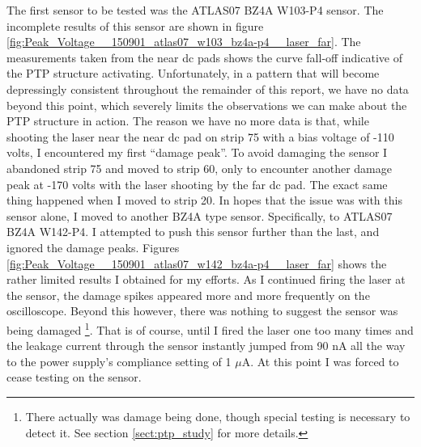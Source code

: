 \documentclass{report}
\begin{document}
            The first sensor to be tested was the ATLAS07 BZ4A W103-P4 sensor. The incomplete results of this sensor are shown in figure \ref{fig:Peak_Voltage__150901_atlas07_w103_bz4a-p4__laser_far}. The measurements taken from the near dc pads shows the curve fall-off indicative of the PTP structure activating. Unfortunately, in a pattern that will become depressingly consistent throughout the remainder of this report, we have no data beyond this point, which severely limits the observations we can make about the PTP structure in action. The reason we have no more data is that, while shooting the laser near the near dc pad on strip 75 with a bias voltage of -110 volts, I encountered my first ``damage peak''. To avoid damaging the sensor I abandoned strip 75 and moved to strip 60, only to encounter another damage peak at -170 volts with the laser shooting by the far dc pad. The exact same thing happened when I moved to strip 20. In hopes that the issue was with this sensor alone, I moved to another BZ4A type sensor. Specifically, to ATLAS07 BZ4A W142-P4. I attempted to push this sensor further than the last, and ignored the damage peaks. Figures \ref{fig:Peak_Voltage__150901_atlas07_w142_bz4a-p4__laser_far} shows the rather limited results I obtained for my efforts. As I continued firing the laser at the sensor, the damage spikes appeared more and more frequently on the oscilloscope. Beyond this however, there was nothing to suggest the sensor was being damaged \footnote{There actually was damage being done, though special testing is necessary to detect it. See section \ref{sect:ptp_study} for more details.}. That is of course, until I fired the laser one too many times and the leakage current through the sensor instantly jumped from 90 nA all the way to the power supply's compliance setting of 1 $\mu$A. At this point I was forced to cease testing on the sensor.
\end{document}
